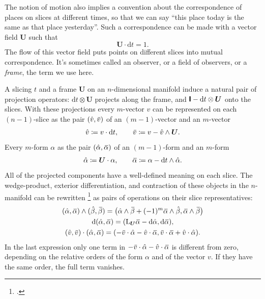 \documentclass[\ifafour a4paper,12pt,\else a5paper,10pt,\fi%
onecolumn,oneside,article,%
british%
]{memoir}
\theoremstyle{remark}
\theoremstyle{innote}
\newcommand*{\citep}{\footcites}%
\newcommand*{\di}{\mathrm{d}}%
\newcommand*{\defd}{\coloneqq}
\renewcommand*{\|}{\nonscript\,\vert\nonscript\;\mathopen{}}
\newcommand*{\sect}{\S}%
\newcommand*{\widebar}[1]{{\mkern1.5mu\skew{2}\overline{\mkern-1.5mu#1\mkern-1.5mu}\mkern 1.5mu}}
\newcommand*{\Li}{\mathrm{L}}
\newcommand*{\yrr}{M}
\newcommand*{\yr}{\bm{\yrr}}
\newcommand*{\ycc}{u}
\newcommand*{\yc}{\bm{\ycc}}
\newcommand*{\yFF}{U}
\newcommand*{\yF}{\bm{\yFF}}
\newcommand*{\yI}{\textsf{\textbf{I}}}
\newcommand*{\yah}{\Hat{\alpha}}
\newcommand*{\yaw}{\widebar{\alpha}}
\newcommand*{\ybh}{\Hat{\beta}}
\newcommand*{\ybw}{\widebar{\beta}}
\newcommand*{\yvh}{\Hat{v}}
\newcommand*{\yvw}{\widebar{v}}
\begin{document}
The notion of motion also implies a convention about the correspondence of
places on slices at different times, so that we can say \enquote{this place
  today is the same as that place yesterday}. Such a correspondence can be
made with a vector field $\yF$ such that
\begin{equation}
  \label{eq:observer_field_unit-time}
  \yF \cdot \di t = 1.
\end{equation}
The flow of this vector field puts points on different slices into mutual
correspondence. It's sometimes called an observer, or a field of observers,
or a \emph{frame}, the term we use here.

A slicing $t$ and a frame $\yF$ on an $n$-dimensional manifold induce a
natural pair of projection operators: $\di t\otimes\yF$ projects along the
frame, and $\yI - \di t \otimes\yF$ onto the slices. With these projections
every $m$-vector $v$ can be represented on each $(n-1)$-slice as the pair
$(\yvh, \yvw)$ of an $(m-1)$-vector and an $m$-vector
\begin{equation}
  \label{eq:projection_vector}
  \yvh \defd v\cdot \di t,
  \qquad
  \yvw \defd v - \yvh\land \yF.
\end{equation}
Every $m$-form $\alpha$ as the pair $(\yah, \yaw)$ of an $(m-1)$-form and
an $m$-form
\begin{equation}
  \label{eq:projection_form}
  \yah \defd \yF \cdot \alpha,
  \qquad
  \yaw \defd \alpha - \di t \land \yah.
\end{equation}
All of the projected components have a well-defined meaning on each slice.
The wedge-product, exterior differentiation, and contraction of these
objects in the $n$-manifold can be rewritten
\citep[\sect~B.1.4]{hehletal2003} as pairs of operations on their slice
representatives:
\begin{gather}
  \label{eq:wedge_projection}
  (\yah, \yaw) \land (\ybh, \ybw) = \bigl(
  \yah \land \ybw +(-1)^m \yaw \land \ybh,
  \yaw \land \ybw \bigr)
  \\
  \label{eq:d_projection}
  \di(\yah, \yaw) = ( \Li_{\yF}\yaw - \di\yah, \di\yaw),
  \\
  \label{eq:contraction_projection}
  (\yvh, \yvw) \cdot (\yah, \yaw) =
  (-\yvw \cdot \yah-\yvh \cdot \yaw, \yvw \cdot \yaw + \yvh \cdot \yah).
\end{gather}
In the last expression only one term in $-\yvw \cdot \yah-\yvh \cdot \yaw$
is different from zero, depending on the relative orders of the form
$\alpha$ and of the vector $v$. If they have the same order, the full
term vanishes.
\end{document}
